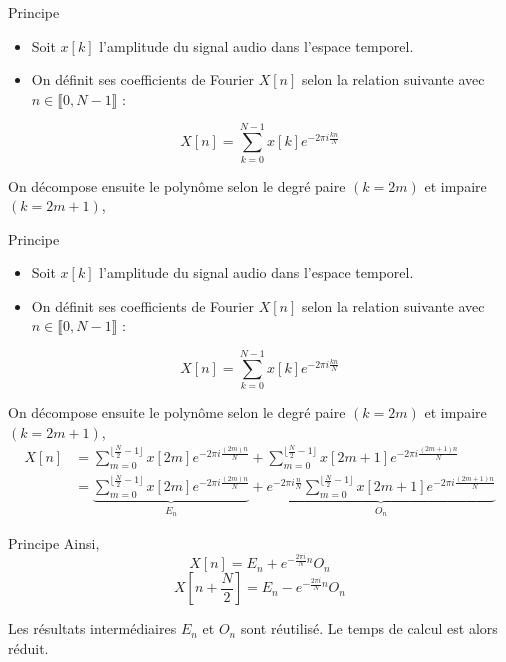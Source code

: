 \documentclass[10pt]{beamer}
\begin{document}
\begin{frame}[t]{Principe}
\begin{itemize}
	\item Soit $x[k]$ l'amplitude du signal audio dans l'espace temporel.
	\item On définit ses coefficients de Fourier $X[n]$ selon la relation suivante avec $n\in \llbracket 0, N-1\rrbracket$ :
\end{itemize}
$$X[n]=\sum^{N-1}_{k=0}x[k]e^{-2\pi i\frac{k n}{N}}$$

On décompose ensuite le polynôme selon le degré paire $(k=2m)$ et impaire $(k=2m+1)$,
\end{frame}
\begin{frame}[t]{Principe}
\begin{itemize}
	\item Soit $x[k]$ l'amplitude du signal audio dans l'espace temporel.
	\item On définit ses coefficients de Fourier $X[n]$ selon la relation suivante avec $n\in \llbracket 0, N-1\rrbracket$ :
\end{itemize}
$$X[n]=\sum^{N-1}_{k=0}x[k]e^{-2\pi i\frac{k n}{N}}$$

On décompose ensuite le polynôme selon le degré paire $(k=2m)$ et impaire $(k=2m+1)$,
\begin{align*}
	X[n]&=\sum^{\lfloor \frac{N}{2}-1\rfloor}_{m=0}x[2m]e^{-2\pi i\frac{(2m)n}{N}} + \sum^{\lfloor \frac{N}{2}-1\rfloor}_{m=0}x[2m+1]e^{-2\pi i\frac{(2m+1)n}{N}}\\
	&=\underbrace{\sum^{\lfloor \frac{N}{2}-1\rfloor}_{m=0}x[2m]e^{-2\pi i\frac{(2m)n}{N}}}_{E_n}+\underbrace{e^{-2\pi i \frac{n}{N}}\sum^{\lfloor \frac{N}{2}-1\rfloor}_{m=0}x[2m+1]e^{-2\pi i\frac{(2m+1)n}{N}}}_{O_n}
\end{align*}
\end{frame}
\begin{frame}[t]{Principe}
	Ainsi,
	$$X[n]=E_n+e^{-\frac{2\pi i}{N}n}O_n$$
	$$X \left[n+\frac{N}{2}\right]=E_n-e^{-\frac{2\pi i}{N}n}O_n$$
	
	Les résultats intermédiaires $E_n$ et $O_n$ sont réutilisé. Le temps de calcul est alors réduit.
\end{frame}
\end{document}
